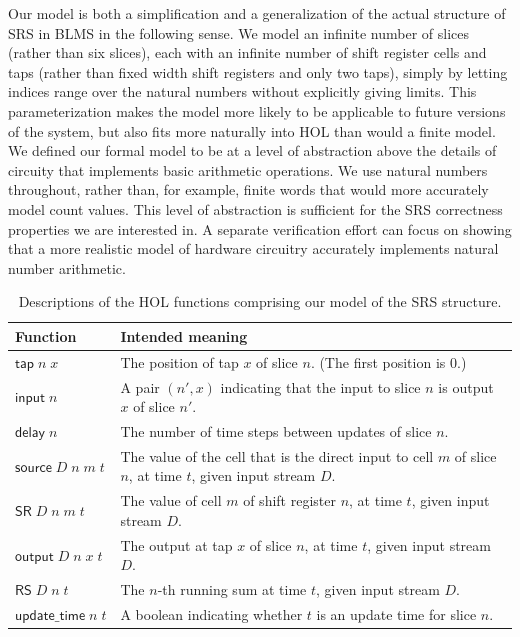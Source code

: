 \documentclass{llncs}
\begin{document}
Our model is both a simplification and a generalization of the actual structure of SRS in BLMS in the following sense.
We model an infinite number of slices (rather than six slices), each with an infinite number of shift register cells and taps (rather than fixed width shift registers and only two taps), simply by letting indices range over the natural numbers without explicitly giving limits.
This parameterization makes the model more likely to be applicable to future versions of the system, but also fits more naturally into HOL than would a finite model.
We defined our formal model to be at a level of abstraction above the details of circuity that implements basic arithmetic operations.
We use natural numbers throughout, rather than, for example, finite words that would more accurately model count values.
This level of abstraction is sufficient for the SRS correctness properties we are interested in.
A separate verification effort can focus on showing that a more realistic model of hardware circuitry accurately implements natural number arithmetic.


\begin{table}[t]
\begin{tabular}{lp{}}
Function&Intended meaning\\
\hline
\(\mathsf{tap}\;n\;x\)&The position of tap $x$ of slice $n$. (The first position is $0$.)\\
\(\mathsf{input}\;n\)&A pair $(n',x)$ indicating that the input to slice $n$ is output $x$ of slice $n'$.\\
\(\mathsf{delay}\;n\)&The number of time steps between updates of slice $n$.\\
\(\mathsf{source}\;D\;n\;m\;t\)&The value of the cell that is the direct input to cell $m$ of slice $n$, at time $t$, given input stream $D$.\\
\(\mathsf{SR}\;D\;n\;m\;t\)&The value of cell $m$ of shift register $n$, at time $t$, given input stream $D$.\\
\(\mathsf{output}\;D\;n\;x\;t\)&The output at tap $x$ of slice $n$, at time $t$, given input stream $D$.\\
\(\mathsf{RS}\;D\;n\;t\)&The $n$-th running sum at time $t$, given input stream $D$.\\
\(\mathsf{update\_time}\;n\;t\)&A boolean indicating whether $t$ is an update time for slice $n$.
\end{tabular}
\vspace{2ex}
\caption{
Descriptions of the HOL functions comprising our model of the SRS structure.
\label{tab:descriptions}
}
\end{table}
\end{document}

